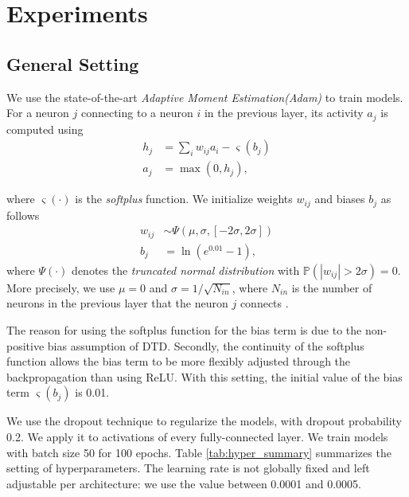 \chapter{Experiments} \label{cha:chapter4}

\section{General Setting}\label{sec:setup}
 
 We use the state-of-the-art \textit{Adaptive Moment Estimation(Adam)} \citep{KingmaAdamMethodStochastic2014} to train models. For a neuron $j$ connecting to a neuron $i$ in the previous layer, its activity $a_j$ is computed using
\begin{align*}
h_j &= \sum_{i} w_{ij} a_i - \varsigma(b_j)
\\
a_j &= \max(0, h_j),
\end{align*}

where $\varsigma(\cdot)$ is the \textit{softplus} function. We initialize weights $w_{ij}$ and biases $b_{j}$ as follows
\begin{align*}
	w_{ij} &\sim \Psi( \mu, \sigma, [-2\sigma, 2\sigma]) \\
	b_{j} &= \ln(e^{0.01} - 1),
\end{align*}
where $\Psi(\cdot)$ denotes the \textit{truncated normal distribution} with $\mathbb{P}(|w_{ij}| > 2\sigma) = 0$. More precisely, we use $\mu=0$ and $\sigma = 1/\sqrt{N_{in}}$, where $N_{in}$ is the number of neurons in the previous layer that the neuron $j$ connects  \citep{GlorotUnderstandingdifficultytraining2010}.


The reason for using the softplus function for the bias term is due to the non-positive bias assumption of DTD. Secondly, the continuity of the softplus function allows the bias term to be more flexibly adjusted through the backpropagation than using ReLU. With this setting, the initial value of the bias term  $\varsigma(b_j)$ is 0.01.

We use the dropout technique \citep{SrivastavaDropoutSimpleWay2014} to regularize the models, with dropout probability 0.2.  We apply it to activations of every fully-connected layer. We train models with batch size 50 for 100 epochs. Table \ref{tab:hyper_summary} summarizes the setting of hyperparameters. The learning rate is not globally fixed and left adjustable per architecture: we use the value between 0.0001 and 0.0005.


